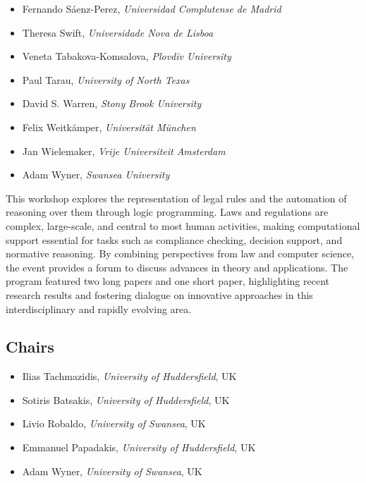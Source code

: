 \documentclass[
]{ceurart}
\begin{document}
\begin{itemize}
\item Fernando Sáenz-Perez, \emph{Universidad Complutense de Madrid}
\item Theresa Swift, \emph{Universidade Nova de Lisboa}
\item Veneta Tabakova-Komsalova, \emph{Plovdiv University}
\item Paul Tarau, \emph{University of North Texas}
\item David S. Warren, \emph{Stony Brook University}
\item Felix Weitkämper, \emph{Universität München}
\item Jan Wielemaker, \emph{Vrije Universiteit Amsterdam}
\item Adam Wyner, \emph{Swansea University}
\end{itemize}



\noindent
This workshop explores the representation of legal rules and the automation of reasoning over them through logic programming. Laws and regulations are complex, large-scale, and central to most human activities, making computational support essential for tasks such as compliance checking, decision support, and normative reasoning. By combining perspectives from law and computer science, the event provides a forum to discuss advances in theory and applications. The program featured two long papers and one short paper, highlighting recent research results and fostering dialogue on innovative approaches in this interdisciplinary and rapidly evolving area.

\subsection*{Chairs}
\begin{itemize}
\item Ilias Tachmazidis, \emph{University of Huddersfield}, UK

\item Sotiris Batsakis, \emph{University of Huddersfield}, UK

\item Livio Robaldo, \emph{University of Swansea}, UK

\item Emmanuel Papadakis, \emph{University of Huddersfield}, UK

\item Adam Wyner, \emph{University of Swansea}, UK
\end{itemize}
\end{document}
